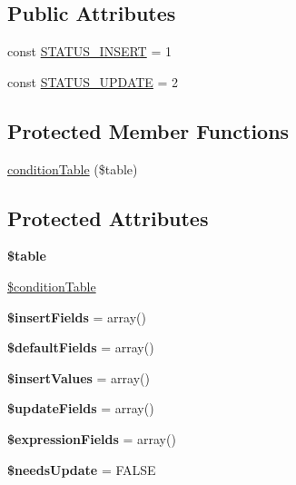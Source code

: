 \subsection*{Public Attributes}
\begin{DoxyCompactItemize}
\item 
const \hyperlink{classMergeQuery_a42f1aad21544decc65082fc10fd2d68a}{STATUS\_\-INSERT} = 1
\item 
const \hyperlink{classMergeQuery_ad79d3ece9a03a3a63bef6560e90fc776}{STATUS\_\-UPDATE} = 2
\end{DoxyCompactItemize}
\subsection*{Protected Member Functions}
\begin{DoxyCompactItemize}
\item 
\hyperlink{classMergeQuery_a0dbb5c2ac711fede2344a02cc49b0efb}{conditionTable} (\$table)
\end{DoxyCompactItemize}
\subsection*{Protected Attributes}
\begin{DoxyCompactItemize}
\item 
\hypertarget{classMergeQuery_ae375df4f0a8f48bf72fe6ab37260fd80}{
{\bfseries \$table}}
\label{classMergeQuery_ae375df4f0a8f48bf72fe6ab37260fd80}

\item 
\hyperlink{classMergeQuery_a8f593caec31bdbc33f24bd741a58a6e5}{\$conditionTable}
\item 
\hypertarget{classMergeQuery_a9e1b39641ffd4d38d1a2841093e9e7a2}{
{\bfseries \$insertFields} = array()}
\label{classMergeQuery_a9e1b39641ffd4d38d1a2841093e9e7a2}

\item 
\hypertarget{classMergeQuery_aeb3068d044d43b3e42e79a669fa12d2b}{
{\bfseries \$defaultFields} = array()}
\label{classMergeQuery_aeb3068d044d43b3e42e79a669fa12d2b}

\item 
\hypertarget{classMergeQuery_aac37e8468f4dcc9c32d4f9cc35500a63}{
{\bfseries \$insertValues} = array()}
\label{classMergeQuery_aac37e8468f4dcc9c32d4f9cc35500a63}

\item 
\hypertarget{classMergeQuery_af645d2050434800e71ad0752f2bd7733}{
{\bfseries \$updateFields} = array()}
\label{classMergeQuery_af645d2050434800e71ad0752f2bd7733}

\item 
\hypertarget{classMergeQuery_a6f164b0b45b4b6b87b3cdee3e33d6a1d}{
{\bfseries \$expressionFields} = array()}
\label{classMergeQuery_a6f164b0b45b4b6b87b3cdee3e33d6a1d}

\item 
\hypertarget{classMergeQuery_a2aa680e4b114585b291446f9f0d887e4}{
{\bfseries \$needsUpdate} = FALSE}
\label{classMergeQuery_a2aa680e4b114585b291446f9f0d887e4}

\end{DoxyCompactItemize}



